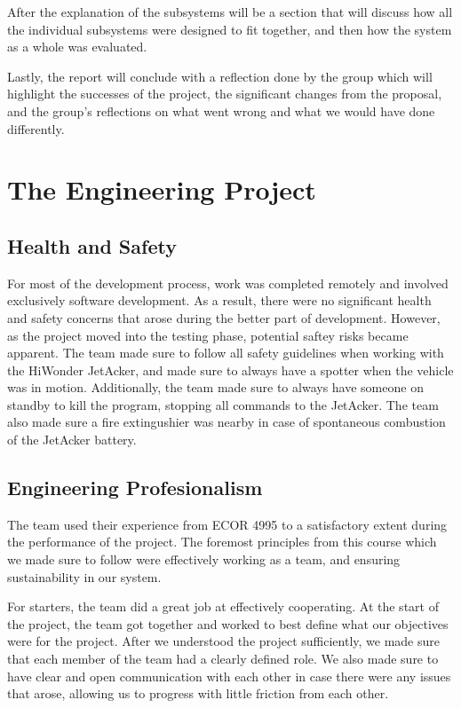 \documentclass[titlepage, draft]{article}
\begin{document}
After the explanation of the subsystems will be a section that will discuss how all the individual subsystems were designed to fit together, and then how the system as a whole was evaluated.

Lastly, the report will conclude with a reflection done by the group which will highlight the successes of the project, the significant changes from the proposal, and the group's reflections on what went wrong and what we would have done differently.

\section{The Engineering Project}

\subsection{Health and Safety}
For most of the development process, work was completed remotely and involved exclusively software development. As a result, there were no significant health and safety concerns that arose during the better part of development. However, as the project moved into the testing phase, potential saftey risks became apparent. The team made sure to follow all safety guidelines when working with the HiWonder JetAcker, and made sure to always have a spotter when the vehicle was in motion. Additionally, the team made sure to always have someone on standby to kill the program, stopping all commands to the JetAcker. The team also made sure a fire extingushier was nearby in case of spontaneous combustion of the JetAcker battery.

\subsection{Engineering Profesionalism}

The team used their experience from ECOR 4995 to a satisfactory extent during the performance of the project. The foremost principles from this course which we made sure to follow were effectively working as a team, and ensuring sustainability in our system.

For starters, the team did a great job at effectively cooperating. At the start of the project, the team got together and worked to best define what our objectives were for the project. After we understood the project sufficiently, we made sure that each member of the team had a clearly defined role. We also made sure to have clear and open communication with each other in case there were any issues that arose, allowing us to progress with little friction from each other.
\end{document}
